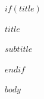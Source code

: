 \documentclass[12pt,a4paper]{article}
\begin{document}
$if(title)$
\begin{center}
  \vspace*{2cm}
  {\propagandafont\fontsize{30}{36}\selectfont\textcolor{SovietRed}{\uppercase{$title$}} \par} %
  \vspace{0.5cm}
  {\large\itshape $subtitle$ \par}                            %
  \vspace{2cm}
\end{center}
$endif$

$body$  %
\end{document}
